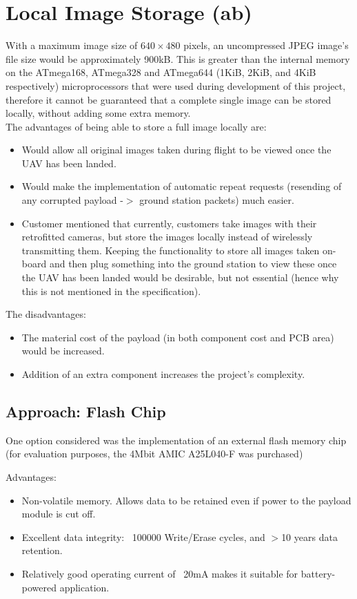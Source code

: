 
\section{Local Image Storage (ab)}
\label{sec:local_storage}

With a maximum image size of $640\times480$ pixels, an uncompressed JPEG 
image's file size would be approximately 900kB.
This is greater than the internal memory on the ATmega168, ATmega328 and 
ATmega644 (1KiB, 2KiB, and 4KiB respectively) microprocessors that were used 
during development of this project, therefore it cannot be guaranteed that a 
complete single image can be stored locally, without adding some extra memory.
\\
The advantages of being able to store a full image locally are:
\begin{itemize}
\item Would allow all original images taken during flight to be viewed once 
the UAV has been landed.
\item Would make the implementation of automatic repeat requests (resending of 
any corrupted payload -$>$ ground station packets) much easier.
\item Customer mentioned that currently, customers take images with their 
retrofitted cameras, but store the images locally instead of wirelessly 
transmitting them. Keeping the functionality to store all images taken 
on-board and then plug something into the ground station to view these once 
the UAV has been landed would be desirable, but not essential (hence why this 
is not mentioned in the specification).
\end{itemize}

The disadvantages:
\begin{itemize}
\item The material cost of the payload (in both component cost and PCB area) 
would be increased.
\item Addition of an extra component increases the project's complexity.
\end{itemize}

\subsection{Approach: Flash Chip}

One option considered was the implementation of an external flash memory chip 
(for evaluation purposes, the 4Mbit AMIC A25L040-F \cite{flash_datasheet} was purchased)

Advantages:
\begin{itemize}
\item Non-volatile memory. Allows data to be retained even if power to the payload module is cut off.
\item Excellent data integrity: ~100000 Write/Erase cycles, and $>$10 years data retention.
\item Relatively good operating current of ~20mA makes it suitable for battery-powered application.
\end{itemize}


